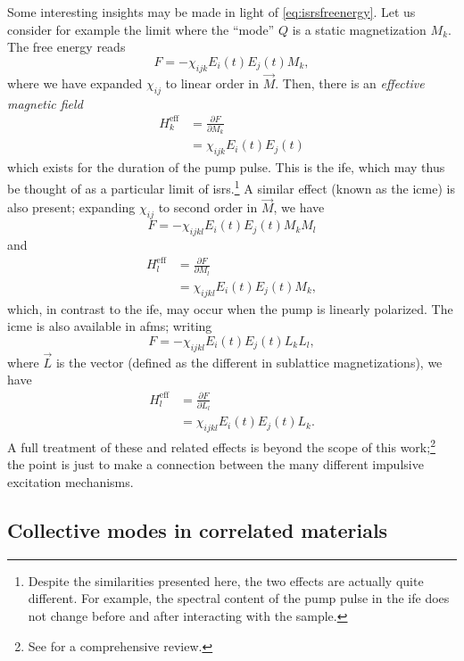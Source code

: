 Some interesting insights may be made in light of \cref{eq:isrsfreenergy}.
Let us consider for example the limit where the ``mode'' $Q$ is a static magnetization $M_k$.
The free energy reads\citep{juraschek_phono-magnetic_2020}
\begin{equation}
F = -\chi_{ijk}E_i(t)E_j(t)M_k,
\end{equation}
where we have expanded $\chi_{ij}$ to linear order in $\vec{M}$.
Then, there is an \emph{effective magnetic field}
\begin{align}
H^\mathrm{eff}_k &= \frac{\partial F}{\partial M_k}\\
&= \chi_{ijk}E_i(t)E_j(t)
\end{align}
which exists for the duration of the pump pulse.
This is the \gls{ife}, which may thus be thought of as a particular limit of \gls{isrs}.\footnote{Despite the similarities presented here, the two effects are actually quite different. For example, the spectral content of the pump pulse in the \gls{ife} does not change before and after interacting with the sample\citep{gridnev_phenomenological_2008}.}
A similar effect (known as the \gls{icme}) is also present; expanding $\chi_{ij}$ to second order in $\vec{M}$, we have
\begin{equation}
F = -\chi_{ijkl}E_i(t)E_j(t)M_kM_l
\end{equation}
and
\begin{align}
H^\mathrm{eff}_l &= \frac{\partial F}{\partial M_l}\\
&= \chi_{ijkl}E_i(t)E_j(t)M_k,
\end{align}
which, in contrast to the \gls{ife}, may occur when the pump is linearly polarized.
The \gls{icme} is also available in \glspl{afm}; writing
\begin{equation}
F = -\chi_{ijkl}E_i(t)E_j(t)L_kL_l,
\end{equation}
where $\vec{L}$ is the \neel vector (defined as the different in sublattice magnetizations), we have
\begin{align}
H^\mathrm{eff}_l &= \frac{\partial F}{\partial L_l}\\
&= \chi_{ijkl}E_i(t)E_j(t)L_k.
\end{align}
A full treatment of these and related effects is beyond the scope of this work;\footnote{See \citet{kirilyuk_ultrafast_2010} for a comprehensive review.} the point is just to make a connection between the many different impulsive excitation mechanisms.

\subsection{Collective modes in correlated materials}


